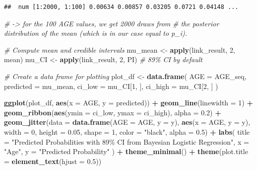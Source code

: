 \documentclass[
]{book}
\newenvironment{Shaded}{\begin{snugshade}}{\end{snugshade}}
\newcommand{\AttributeTok}[1]{\textcolor[rgb]{0.13,0.29,0.53}{#1}}
\newcommand{\CommentTok}[1]{\textcolor[rgb]{0.56,0.35,0.01}{\textit{#1}}}
\newcommand{\DecValTok}[1]{\textcolor[rgb]{0.00,0.00,0.81}{#1}}
\newcommand{\FloatTok}[1]{\textcolor[rgb]{0.00,0.00,0.81}{#1}}
\newcommand{\FunctionTok}[1]{\textcolor[rgb]{0.13,0.29,0.53}{\textbf{#1}}}
\newcommand{\NormalTok}[1]{#1}
\newcommand{\OtherTok}[1]{\textcolor[rgb]{0.56,0.35,0.01}{#1}}
\newcommand{\SpecialCharTok}[1]{\textcolor[rgb]{0.81,0.36,0.00}{\textbf{#1}}}
\newcommand{\StringTok}[1]{\textcolor[rgb]{0.31,0.60,0.02}{#1}}
\begin{document}
\begin{verbatim}
##  num [1:2000, 1:100] 0.00634 0.00857 0.03205 0.0721 0.04148 ...
\end{verbatim}

\begin{Shaded}
\begin{Highlighting}[]
\CommentTok{\# {-}\textgreater{} for the 100 AGE values, we get 2000 draws from}
\CommentTok{\# the posterior distribution of the mean (which is in our case equal to p\_i).}

\CommentTok{\# Compute mean and credible intervals}
\NormalTok{mu\_mean }\OtherTok{\textless{}{-}} \FunctionTok{apply}\NormalTok{(link\_result, }\DecValTok{2}\NormalTok{, mean)}
\NormalTok{mu\_CI }\OtherTok{\textless{}{-}} \FunctionTok{apply}\NormalTok{(link\_result, }\DecValTok{2}\NormalTok{, PI)  }\CommentTok{\# 89\% CI by default}

\CommentTok{\# Create a data frame for plotting}
\NormalTok{plot\_df }\OtherTok{\textless{}{-}} \FunctionTok{data.frame}\NormalTok{(}
  \AttributeTok{AGE =}\NormalTok{ AGE\_seq,}
  \AttributeTok{predicted =}\NormalTok{ mu\_mean,}
  \AttributeTok{ci\_low =}\NormalTok{ mu\_CI[}\DecValTok{1}\NormalTok{, ],}
  \AttributeTok{ci\_high =}\NormalTok{ mu\_CI[}\DecValTok{2}\NormalTok{, ]}
\NormalTok{)}

\FunctionTok{ggplot}\NormalTok{(plot\_df, }\FunctionTok{aes}\NormalTok{(}\AttributeTok{x =}\NormalTok{ AGE, }\AttributeTok{y =}\NormalTok{ predicted)) }\SpecialCharTok{+}
  \FunctionTok{geom\_line}\NormalTok{(}\AttributeTok{linewidth =} \DecValTok{1}\NormalTok{) }\SpecialCharTok{+}
  \FunctionTok{geom\_ribbon}\NormalTok{(}\FunctionTok{aes}\NormalTok{(}\AttributeTok{ymin =}\NormalTok{ ci\_low, }\AttributeTok{ymax =}\NormalTok{ ci\_high), }\AttributeTok{alpha =} \FloatTok{0.2}\NormalTok{) }\SpecialCharTok{+}
  \FunctionTok{geom\_jitter}\NormalTok{(}\AttributeTok{data =} \FunctionTok{data.frame}\NormalTok{(}\AttributeTok{AGE =}\NormalTok{ AGE, }\AttributeTok{y =}\NormalTok{ y),}
              \FunctionTok{aes}\NormalTok{(}\AttributeTok{x =}\NormalTok{ AGE, }\AttributeTok{y =}\NormalTok{ y),}
              \AttributeTok{width =} \DecValTok{0}\NormalTok{, }\AttributeTok{height =} \FloatTok{0.05}\NormalTok{,}
              \AttributeTok{shape =} \DecValTok{1}\NormalTok{, }\AttributeTok{color =} \StringTok{"black"}\NormalTok{, }\AttributeTok{alpha =} \FloatTok{0.5}\NormalTok{) }\SpecialCharTok{+}
  \FunctionTok{labs}\NormalTok{(}
    \AttributeTok{title =} \StringTok{"Predicted Probabilities with 89\% CI from Bayesian Logistic Regression"}\NormalTok{,}
    \AttributeTok{x =} \StringTok{"Age"}\NormalTok{,}
    \AttributeTok{y =} \StringTok{"Predicted Probability"}
\NormalTok{  ) }\SpecialCharTok{+}
  \FunctionTok{theme\_minimal}\NormalTok{() }\SpecialCharTok{+}
  \FunctionTok{theme}\NormalTok{(}\AttributeTok{plot.title =} \FunctionTok{element\_text}\NormalTok{(}\AttributeTok{hjust =} \FloatTok{0.5}\NormalTok{))}
\end{Highlighting}
\end{Shaded}
\end{document}
